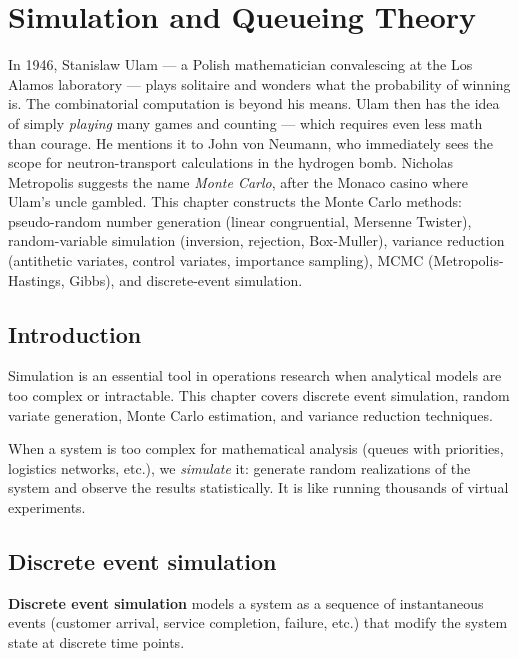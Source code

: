 \chapter{Simulation and Queueing Theory}
\label{ch:simulation}

In 1946, Stanislaw Ulam --- a Polish mathematician convalescing at the Los Alamos laboratory --- plays solitaire and wonders what the probability of winning is. The combinatorial computation is beyond his means. Ulam then has the idea of simply \emph{playing} many games and counting --- which requires even less math than courage. He mentions it to John von Neumann, who immediately sees the scope for neutron-transport calculations in the hydrogen bomb. Nicholas Metropolis suggests the name \emph{Monte Carlo}, after the Monaco casino where Ulam's uncle gambled. This chapter constructs the Monte Carlo methods: pseudo-random number generation (linear congruential, Mersenne Twister), random-variable simulation (inversion, rejection, Box-Muller), variance reduction (antithetic variates, control variates, importance sampling), MCMC (Metropolis-Hastings, Gibbs), and discrete-event simulation.

\section{Introduction}

Simulation is an essential tool in operations research when analytical models
are too complex or intractable. This chapter covers discrete event simulation,
random variate generation, Monte Carlo estimation, and variance reduction
techniques.

\begin{intuition}
When a system is too complex for mathematical analysis (queues with priorities,
logistics networks, etc.), we \emph{simulate} it: generate random realizations
of the system and observe the results statistically. It is like running
thousands of virtual experiments.
\end{intuition}

\section{Discrete event simulation}

\begin{definition}
\textbf{Discrete event simulation} models a system as a sequence of
instantaneous events (customer arrival, service completion, failure, etc.)
that modify the system state at discrete time points.
\end{definition}

